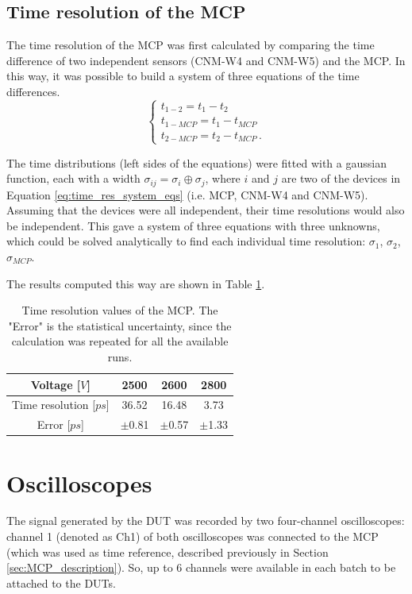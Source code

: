 \subsection{Time resolution of the MCP}
The time resolution of the MCP was first calculated by comparing the time difference of two independent sensors (CNM-W4 and CNM-W5) and the MCP. In this way, it was possible to build a system of three equations of the time differences. 
\begin{equation}\label{eq:time_res_system_eqs}
    \begin{cases}
        t_{1-2} = t_1 - t_2  \\
        t_{1-MCP} = t_1 - t_{MCP} \\
        t_{2-MCP} = t_2 - t_{MCP} \, .
    \end{cases}
\end{equation}

The time distributions (left sides of the equations) were fitted with a gaussian function, each with a width $\sigma_{ij} = \sigma_i \oplus \sigma_j$, where $i$ and $j$ are two of the devices in Equation \ref{eq:time_res_system_eqs} (i.e. MCP, CNM-W4 and CNM-W5). Assuming that the devices were all independent, their time resolutions would also be independent. This gave a system of three equations with three unknowns, which could be solved analytically to find each individual time resolution: $\sigma_1$, $\sigma_2$, $\sigma_{MCP}$.

The results computed this way are shown in Table \ref{tab:MCP_time_resolution}.
\begin{table}[!ht]
    \begin{center}
        \caption{Time resolution values of the MCP. The "Error" is the statistical uncertainty, since the calculation was repeated for all the available runs.}
        \label{tab:MCP_time_resolution}
        \begin{tabular}{ | c | c | c | c | }
            \hline
            Voltage [$\si{V}$] & 2500 & 2600 & 2800 \\ 
            \hline 
            Time resolution [$\si{ps}$] & 36.52 & 16.48 & 3.73 \\  
            Error [$\si{ps}$] & $\pm$0.81 & $\pm$0.57 & $\pm$1.33 \\
            \hline
        \end{tabular}
    \end{center}
\end{table}


\section{Oscilloscopes}
The signal generated by the DUT was recorded by two four-channel oscilloscopes: channel 1 (denoted as Ch1) of both oscilloscopes was connected to the MCP (which was used as time reference, described previously in Section \ref{sec:MCP_description}). So, up to 6 channels were available in each batch to be attached to the DUTs.


